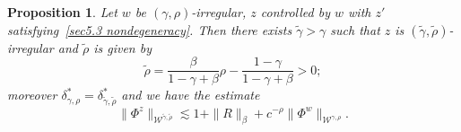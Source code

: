 \documentclass[10pt]{article}
\newtheorem{proposition}[theorem]{Proposition}
\begin{document}
\begin{proposition}
  \label{sec5.3 prop perturbations}Let $w$ be $(\gamma,
  \rho)$\mbox{-}irregular, $z$ controlled by $w$ with $z'$
  satisfying~\eqref{sec5.3 nondegeneracy}. Then there exists $\tilde{\gamma} >
  \gamma$ such that $z$ is $(\tilde{\gamma}, \tilde{\rho})$\mbox{-}irregular and
  $\tilde{\rho}$ is given by
  \begin{equation*}
  	\tilde{\rho} = \frac{\beta}{1 - \gamma + \beta} \rho - \frac{1 -
     \gamma}{1 - \gamma + \beta} > 0;
  \end{equation*}
  moreover $\delta^{\ast}_{\gamma, \rho} = \delta^{\ast}_{\tilde{\gamma},
  \tilde{\rho}}$ and we have the estimate
  \[ \| \Phi^z \|_{\mathcal{W}^{\tilde{\gamma}, \tilde{\rho}}} \lesssim 1 + \| R
     \|_{\beta} + c^{- \rho} \| \Phi^w \|_{\mathcal{W}^{\gamma, \rho}}
     . \]
\end{proposition}
\end{document}
